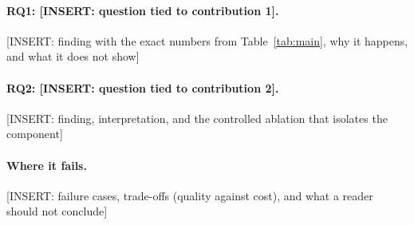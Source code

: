 \paragraph{RQ1: [INSERT: question tied to contribution 1].}
[INSERT: finding with the exact numbers from Table~\ref{tab:main}, why it happens, and what it does not show]

\paragraph{RQ2: [INSERT: question tied to contribution 2].}
[INSERT: finding, interpretation, and the controlled ablation that isolates the component]

\paragraph{Where it fails.}
[INSERT: failure cases, trade-offs (quality against cost), and what a reader should not conclude]
